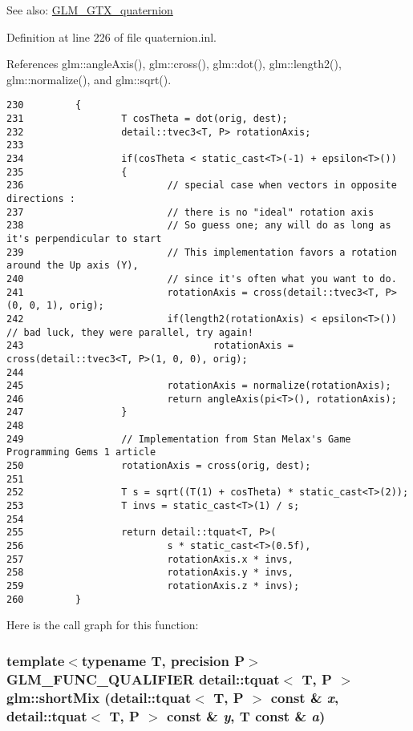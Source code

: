 \begin{Desc}
\item[See also:]\hyperlink{group__gtx__quaternion}{GLM\_\-GTX\_\-quaternion} \end{Desc}


Definition at line 226 of file quaternion.inl.

References glm::angleAxis(), glm::cross(), glm::dot(), glm::length2(), glm::normalize(), and glm::sqrt().

\begin{Code}\begin{verbatim}230         {
231                 T cosTheta = dot(orig, dest);
232                 detail::tvec3<T, P> rotationAxis;
233 
234                 if(cosTheta < static_cast<T>(-1) + epsilon<T>())
235                 {
236                         // special case when vectors in opposite directions :
237                         // there is no "ideal" rotation axis
238                         // So guess one; any will do as long as it's perpendicular to start
239                         // This implementation favors a rotation around the Up axis (Y),
240                         // since it's often what you want to do.
241                         rotationAxis = cross(detail::tvec3<T, P>(0, 0, 1), orig);
242                         if(length2(rotationAxis) < epsilon<T>()) // bad luck, they were parallel, try again!
243                                 rotationAxis = cross(detail::tvec3<T, P>(1, 0, 0), orig);
244 
245                         rotationAxis = normalize(rotationAxis);
246                         return angleAxis(pi<T>(), rotationAxis);
247                 }
248 
249                 // Implementation from Stan Melax's Game Programming Gems 1 article
250                 rotationAxis = cross(orig, dest);
251 
252                 T s = sqrt((T(1) + cosTheta) * static_cast<T>(2));
253                 T invs = static_cast<T>(1) / s;
254 
255                 return detail::tquat<T, P>(
256                         s * static_cast<T>(0.5f), 
257                         rotationAxis.x * invs,
258                         rotationAxis.y * invs,
259                         rotationAxis.z * invs);
260         }
\end{verbatim}
\end{Code}




Here is the call graph for this function:\hypertarget{group__gtx__quaternion_g1d83d29dc8f5870d70d2833c64be777c}{
\subsubsection[shortMix]{\setlength{\rightskip}{0pt plus 5cm}template$<$typename T, precision P$>$ GLM\_\-FUNC\_\-QUALIFIER detail::tquat$<$ T, P $>$ glm::shortMix (detail::tquat$<$ T, P $>$ const \& {\em x}, \/  detail::tquat$<$ T, P $>$ const \& {\em y}, \/  T const \& {\em a})}}
\label{group__gtx__quaternion_g1d83d29dc8f5870d70d2833c64be777c}



